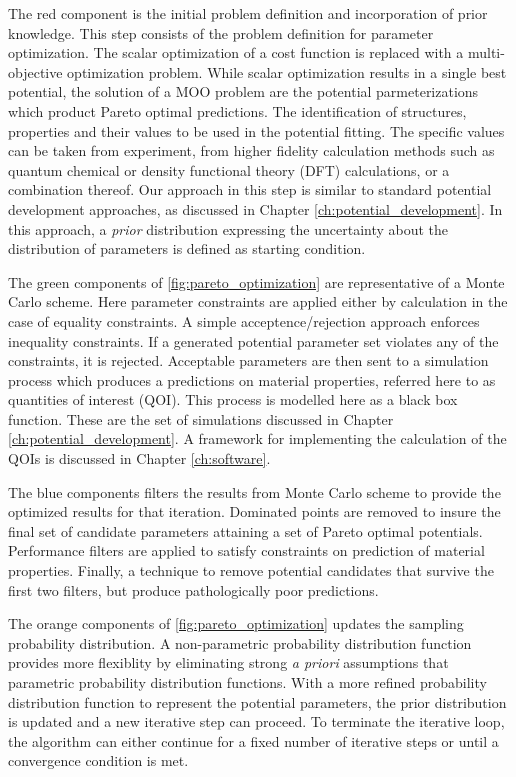 The red component is the initial problem definition and incorporation of prior knowledge.  This step consists of the problem definition for parameter optimization.  The scalar optimization of a cost function is replaced with a multi-objective optimization problem.  While scalar optimization results in a single best potential, the solution of a MOO problem are the potential parmeterizations which product Pareto optimal predictions.  The identification of structures, properties and their values to be used in the potential fitting. The specific values can be taken from experiment, from higher fidelity calculation methods such as quantum chemical or density functional theory (DFT) calculations, or a combination thereof. Our approach in this step is similar to standard potential development approaches, as discussed in Chapter \ref{ch:potential_development}.  In this approach, a \emph{prior} distribution expressing the uncertainty about the distribution of parameters is defined as starting condition.

The green components of \ref{fig:pareto_optimization} are representative of a Monte Carlo scheme.  Here parameter constraints are applied either by calculation in the case of equality constraints.  A simple acceptence/rejection approach enforces inequality constraints.  If a generated potential parameter set violates any of the constraints, it is rejected.  Acceptable parameters are then sent to a simulation process which produces a predictions on material properties, referred here to as quantities of interest (QOI).  This process is modelled here as a black box function. These are the set of simulations discussed in Chapter \ref{ch:potential_development}.  A framework for implementing the calculation of the QOIs is discussed in Chapter \ref{ch:software}.

The blue components filters the results from Monte Carlo scheme to provide the optimized results for that iteration.  Dominated points are removed to insure the final set of candidate parameters attaining a set of Pareto optimal potentials.  Performance filters are applied to satisfy constraints on prediction of material properties.  Finally, a technique to remove potential candidates that survive the first two filters, but produce pathologically poor predictions.

The orange components of \ref{fig:pareto_optimization} updates the sampling probability distribution.    A non-parametric  probability distribution function provides more flexiblity by eliminating strong \emph{a priori} assumptions that parametric probability distribution functions.  With a more refined probability distribution function to represent the potential parameters, the prior distribution is updated and a new iterative step can proceed.  To terminate the iterative loop, the algorithm can either continue for a fixed number of iterative steps or until a convergence condition is met.

